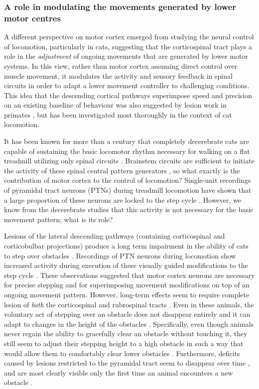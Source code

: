 \subsubsection*{A role in modulating the movements generated by lower motor centres}

A different perspective on motor cortex emerged from studying the neural control of locomotion, particularly in cats, suggesting that the corticospinal tract plays a role in the \emph{adjustment} of ongoing movements that are generated by lower motor systems. In this view, rather than motor cortex assuming direct control over muscle movement, it modulates the activity and sensory feedback in spinal circuits in order to adapt a lower movement controller to challenging conditions. This idea that the descending cortical pathways superimpose speed and precision on an existing baseline of behaviour was also suggested by lesion work in primates \cite{Lawrence1968a}, but has been investigated most thoroughly in the context of cat locomotion.

It has been known for more than a century that completely decerebrate cats are capable of sustaining the basic locomotor rhythm necessary for walking on a flat treadmill utilizing only spinal circuits \cite{GrahamBrown1911}. Brainstem circuits are sufficient to initiate the activity of these spinal central pattern generators \cite{Grillner1973}, so what exactly is the contribution of motor cortex to the control of locomotion? Single-unit recordings of pyramidal tract neurons (PTNs) during treadmill locomotion have shown that a large proportion of these neurons are locked to the step cycle \cite{Armstrong1984a}. However, we know from the decerebrate studies that this activity is not necessary for the basic movement pattern; what is its role?

Lesions of the lateral descending pathways (containing corticospinal and corticobulbar projections) produce a long term impairment in the ability of cats to step over obstacles \cite{Drew2002}. Recordings of PTN neurons during locomotion show increased activity during execution of these visually guided modifications to the step cycle \cite{Drew1996}. These observations suggested that motor cortex neurons are necessary for precise stepping and for superimposing movement modifications on top of an ongoing movement pattern. However, long-term effects seem to require complete lesion of \emph{both} the corticospinal and rubrospinal tracts \cite{Drew2002}. Even in these animals, the voluntary act of stepping over an obstacle does not disappear entirely and it can adapt to changes in the height of the obstacles \cite{Drew2002}. Specifically, even though animals never regain the ability to gracefully clear an obstacle without touching it, they still seem to adjust their stepping height to a high obstacle in such a way that would allow them to comfortably clear lower obstacles \cite{Drew2002}. Furthermore, deficits caused by lesions restricted to the pyramidal tract seem to disappear over time \cite{Liddell1944}, and are most clearly visible only the first time an animal encounters a new obstacle \cite{Liddell1944}.

